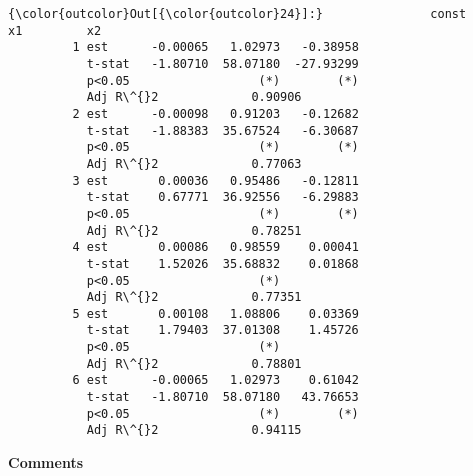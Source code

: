 \documentclass[11pt]{article}
\begin{document}
            \begin{Verbatim}[commandchars=\\\{\}]
{\color{outcolor}Out[{\color{outcolor}24}]:}               const        x1         x2
         1 est      -0.00065   1.02973   -0.38958
           t-stat   -1.80710  58.07180  -27.93299
           p<0.05                  (*)        (*)
           Adj R\^{}2             0.90906           
         2 est      -0.00098   0.91203   -0.12682
           t-stat   -1.88383  35.67524   -6.30687
           p<0.05                  (*)        (*)
           Adj R\^{}2             0.77063           
         3 est       0.00036   0.95486   -0.12811
           t-stat    0.67771  36.92556   -6.29883
           p<0.05                  (*)        (*)
           Adj R\^{}2             0.78251           
         4 est       0.00086   0.98559    0.00041
           t-stat    1.52026  35.68832    0.01868
           p<0.05                  (*)           
           Adj R\^{}2             0.77351           
         5 est       0.00108   1.08806    0.03369
           t-stat    1.79403  37.01308    1.45726
           p<0.05                  (*)           
           Adj R\^{}2             0.78801           
         6 est      -0.00065   1.02973    0.61042
           t-stat   -1.80710  58.07180   43.76653
           p<0.05                  (*)        (*)
           Adj R\^{}2             0.94115           
\end{Verbatim}
        
    \textbf{Comments}
\end{document}
